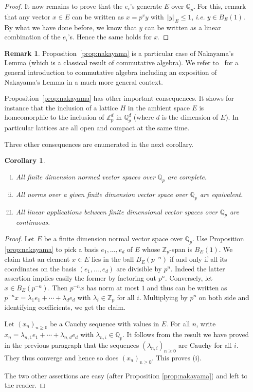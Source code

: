 \documentclass[11pt]{article}
\numberwithin{equation}{section}
\numberwithin{figure}{section}
\renewcommand{\leq}{\leqslant}
\renewcommand{\geq}{\geqslant}
\newtheorem{cor}[theo]{Corollary}
\theoremstyle{definition}
\newtheorem{rem}[theo]{Remark}
\newcommand{\Z}{\mathbb Z}
\newcommand{\Zp}{\Z_p}
\newcommand{\Q}{\mathbb Q}
\newcommand{\Qp}{\Q_p}
\begin{document}
\begin{proof}
It now remains to prove that the $e_i$'s generate $E$ over $\Qp$.
For this, remark that any vector $x \in E$ can be written as $x =
p^v y$ with $\Vert y \Vert_E \leq 1$, \emph{i.e.} $y \in B_E(1)$.
By what we have done before, we know that $y$ can be written as a
linear combination of the $e_i$'s. Hence the same holds for $x$.
\end{proof}

\begin{rem}
Proposition~\ref{prop:nakayama} is a particular case of Nakayama's
Lemma (which is a classical result of commutative
algebra). We refer to~\cite{Ei95} for a general introduction to 
commutative algebra including an exposition of Nakayama's
Lemma in a much more general context.
\end{rem}

Proposition~\ref{prop:nakayama} has other important consequences. It 
shows for instance that the inclusion of a lattice $H$ in the ambient 
space $E$ is homeomorphic to the inclusion of $\Zp^d$ in $\Qp^d$ 
(where $d$ is the dimension of $E$). In particular lattices are all
open and compact at the same time.

Three other consequences are enumerated in the next corollary.

\begin{cor}
\label{cor:complete}
\begin{enumerate}[(i)]
\renewcommand{\itemsep}{0pt}
\item
All finite dimension normed vector spaces over $\Qp$ are complete.
\item
All norms over a given finite dimension vector space over $\Qp$
are equivalent.
\item
All linear applications between finite dimensional vector spaces over 
$\Qp$ are continuous.
\end{enumerate}
\end{cor}

\begin{proof}
Let $E$ be a finite dimension normal vector space over $\Qp$. Use
Proposition \ref{prop:nakayama} to 
pick a basis $e_1, \ldots, e_d$ of $E$ whose $\Zp$-span
is $B_E(1)$. We claim that an element $x \in E$ lies in the ball
$B_E(p^{-n})$ if and only if all its coordinates on the basis $(e_1,
\ldots, e_d)$ are divisible by $p^n$. Indeed the latter assertion
implies easily the former by factoring out $p^n$. Conversely, let
$x \in B_E(p^{-n})$. Then $p^{-n} x$ has norm at most $1$ and thus 
can be written as
$p^{-n} x = \lambda_1 e_1 + \cdots + \lambda_d e_d$
with $\lambda_i \in \Zp$ for all $i$. Multiplying by $p^n$ on both 
side and identifying coefficients, we get the claim.

Let $(x_n)_{n \geq 0}$ be a Cauchy sequence with values in $E$. For
all $n$, write $x_n = \lambda_{n,1} e_1 + \cdots + \lambda_{n,d} e_d$
with $\lambda_{n,i} \in \Qp$. It follows from the result we have 
proved in the previous paragraph that the sequences $(\lambda_{n,i})
_{n \geq 0}$ are Cauchy for all $i$. They thus converge and hence so 
does $(x_n)_{n \geq 0}$. This proves (i).

The two other assertions are easy (after Proposition 
\ref{prop:nakayama}) and left to the reader.
\end{proof}
\end{document}
